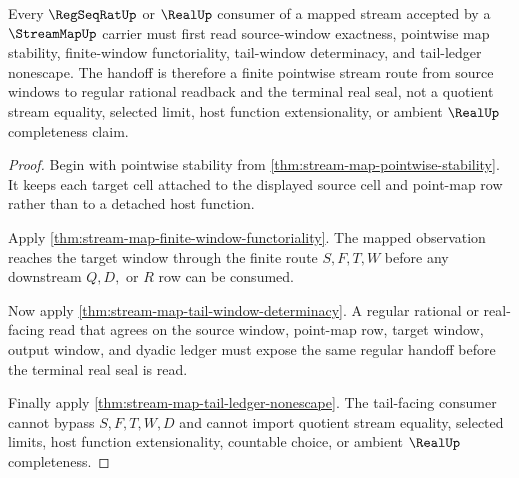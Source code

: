 \begin{theorem}
\label{thm:stream-map-regseq-real-handoff}
Every $\RegSeqRatUp$ or $\RealUp$ consumer of a mapped stream accepted by a $\StreamMapUp$ carrier must first read source-window exactness, pointwise map stability, finite-window functoriality, tail-window determinacy, and tail-ledger nonescape. The handoff is therefore a finite pointwise stream route from source windows to regular rational readback and the terminal real seal, not a quotient stream equality, selected limit, host function extensionality, or ambient $\RealUp$ completeness claim.
\end{theorem}
\begin{proof}
Begin with pointwise stability from \autoref{thm:stream-map-pointwise-stability}. It keeps each target cell attached to the displayed source cell and point-map row rather than to a detached host function.

Apply \autoref{thm:stream-map-finite-window-functoriality}. The mapped observation reaches the target window through the finite route $S,F,T,W$ before any downstream $Q,D,$ or $R$ row can be consumed.

Now apply \autoref{thm:stream-map-tail-window-determinacy}. A regular rational or real-facing read that agrees on the source window, point-map row, target window, output window, and dyadic ledger must expose the same regular handoff before the terminal real seal is read.

Finally apply \autoref{thm:stream-map-tail-ledger-nonescape}. The tail-facing consumer cannot bypass $S,F,T,W,D$ and cannot import quotient stream equality, selected limits, host function extensionality, countable choice, or ambient $\RealUp$ completeness.
\end{proof}


